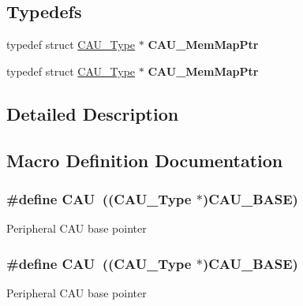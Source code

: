 \subsection*{Typedefs}
\begin{DoxyCompactItemize}
\item 
typedef struct \hyperlink{structCAU__Type}{C\+A\+U\+\_\+\+Type} $\ast$ {\bfseries C\+A\+U\+\_\+\+Mem\+Map\+Ptr}\hypertarget{group__CAU__Peripheral__Access__Layer_ga2e385ae9e5abc0b51db60576ba85e33e}{}\label{group__CAU__Peripheral__Access__Layer_ga2e385ae9e5abc0b51db60576ba85e33e}

\item 
typedef struct \hyperlink{structCAU__Type}{C\+A\+U\+\_\+\+Type} $\ast$ {\bfseries C\+A\+U\+\_\+\+Mem\+Map\+Ptr}\hypertarget{group__CAU__Peripheral__Access__Layer_ga2e385ae9e5abc0b51db60576ba85e33e}{}\label{group__CAU__Peripheral__Access__Layer_ga2e385ae9e5abc0b51db60576ba85e33e}

\end{DoxyCompactItemize}


\subsection{Detailed Description}


\subsection{Macro Definition Documentation}
\subsubsection[{\texorpdfstring{C\+AU}{CAU}}]{\setlength{\rightskip}{0pt plus 5cm}\#define C\+AU~(({\bf C\+A\+U\+\_\+\+Type} $\ast$){\bf C\+A\+U\+\_\+\+B\+A\+SE})}\hypertarget{group__CAU__Peripheral__Access__Layer_ga0e3e4bb9b7bb5ef30b07e8925c56b950}{}\label{group__CAU__Peripheral__Access__Layer_ga0e3e4bb9b7bb5ef30b07e8925c56b950}
Peripheral C\+AU base pointer 
\subsubsection[{\texorpdfstring{C\+AU}{CAU}}]{\setlength{\rightskip}{0pt plus 5cm}\#define C\+AU~(({\bf C\+A\+U\+\_\+\+Type} $\ast$){\bf C\+A\+U\+\_\+\+B\+A\+SE})}\hypertarget{group__CAU__Peripheral__Access__Layer_ga0e3e4bb9b7bb5ef30b07e8925c56b950}{}\label{group__CAU__Peripheral__Access__Layer_ga0e3e4bb9b7bb5ef30b07e8925c56b950}
Peripheral C\+AU base pointer 
